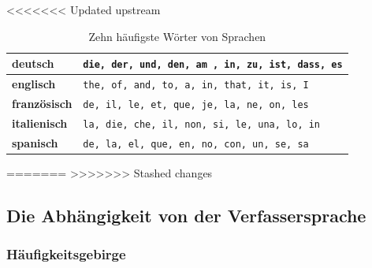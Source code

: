 \documentclass[%
<<<<<<< Updated upstream
11pt,%
twoside,%
titlepage,%
german,%
headsepline%
]{scrartcl}
\newcommand{\spaltenheight}{\rule{0mm}{3ex}}
\newcommand{\spaltensep}{\\[1ex]}
\begin{document}
<<<<<<< Updated upstream
\begin{table}
\begin{center}
\begin{tabular}{|l|l|}
\hline
\rowcolor{lightyellow}\spaltenheight \textbf{deutsch} &	\texttt{die, der, und, den, am , in, zu, ist, dass, es}\spaltensep\hline
\rowcolor{Gray}\spaltenheight \textbf{englisch} &	\texttt{the, of, and, to, a, in, that, it, is, I}\spaltensep\hline
\rowcolor{lightyellow}\spaltenheight \textbf{französisch} &	\texttt{de, il, le, et, que, je, la, ne, on, les}\spaltensep\hline
\rowcolor{Gray}\spaltenheight \textbf{italienisch} &	\texttt{la, die, che, il, non, si, le, una, lo, in}\spaltensep\hline
\rowcolor{lightyellow}\spaltenheight \textbf{spanisch} &	 \texttt{de, la, el, que, en, no, con, un, se, sa}\spaltensep\hline
\end{tabular}
\end{center}
\caption{Zehn häufigste Wörter von Sprachen}\label{zehn}
\end{table}

=======
>>>>>>> Stashed changes
\subsection{Die Abhängigkeit von der Verfassersprache}

\subsubsection{Häufigkeitsgebirge}
\end{document}
